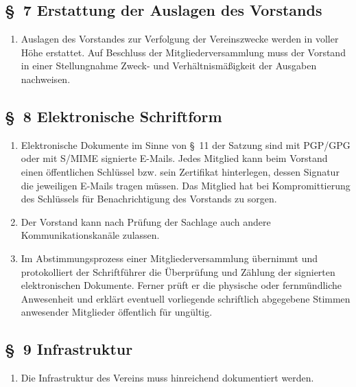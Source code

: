 \documentclass[10pt,a4paper]{article}
\begin{document}
\subsection*{\S \ 7 Erstattung der Auslagen des Vorstands}
\begin{enumerate}
\item Auslagen des Vorstandes zur Verfolgung der Vereinszwecke werden
	in voller H{\"o}he erstattet. Auf Beschluss der Mitgliederversammlung
	muss der Vorstand in einer Stellungnahme Zweck- und Verh{\"a}ltnis\-m{\"a}{\ss}igkeit
	der Ausgaben nachweisen.
\end{enumerate}
%
%
\subsection*{\S \ 8 Elektronische Schriftform}
\begin{enumerate}
\item Elektronische Dokumente im Sinne von \S \ 11 der Satzung sind mit PGP/GPG
	oder mit S/MIME signierte E-Mails. Jedes Mitglied kann beim Vorstand
	einen {\"o}ffentlichen Schl{\"u}ssel bzw. sein Zertifikat hinterlegen, dessen
	Signatur die jeweiligen E-Mails tragen m{\"u}ssen. Das Mitglied hat bei
	Kompromittierung des Schl{\"u}ssels f{\"u}r Benachrichtigung des Vorstands
	zu sorgen.
\item Der Vorstand kann nach Pr{\"u}fung der Sachlage auch andere Kommunikationskan{\"a}le zulassen.
\item Im Abstimmungsprozess einer Mitgliederversammlung
	{\"u}bernimmt und protokolliert der Schriftf{\"u}hrer die {\"U}berpr{\"u}fung und
    Z{\"a}hlung der signierten elektronischen Dokumente. Ferner pr{\"u}ft er die physische oder fernm{\"u}ndliche Anwesenheit und
	erkl{\"a}rt eventuell vorliegende schriftlich abgegebene Stimmen anwesender
	Mitglieder {\"o}ffentlich f{\"u}r ung{\"u}ltig.
\end{enumerate}
%
%
\subsection*{\S \ 9 Infrastruktur}
\begin{enumerate}
\item Die Infrastruktur des Vereins muss hinreichend dokumentiert werden.
\end{enumerate}
\end{document}
